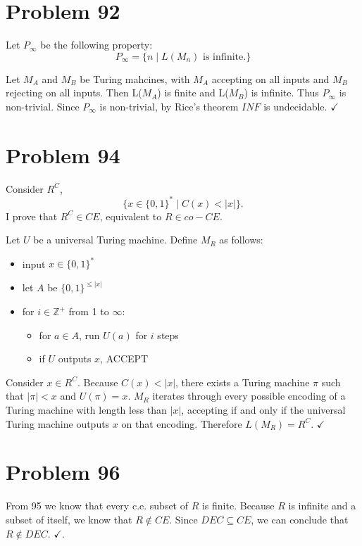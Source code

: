 \documentclass[11pt]{article}
\begin{document}
\section*{Problem 92}

Let $P_\infty$ be the following property:
	\[ P_\infty = \{ n \mid L(M_n) \text{ is infinite}. \}\] 

Let $M_A$ and $M_B$ be Turing mahcines, with $M_A$ accepting on all inputs and $M_B$ rejecting on all inputs.
Then L($M_A$) is finite and L($M_B$) is infinite. 
Thus $P_\infty$ is non-trivial.
Since $P_\infty$ is non-trivial, by Rice's theorem $INF$ is undecidable. $\checkmark$


\section*{Problem 94}

Consider $R^C$,
	\[ \{x \in \{0,1\}^* \mid C(x) < |x| \}. \]
I prove that $R^C \in CE$, equivalent to $R \in co-CE$.

Let $U$ be a universal Turing machine.
Define $M_R$ as follows:
\begin{itemize}
	\item input $x \in \{0,1\}^* $
	\item let $A$ be $\{0,1\}^{\leq |x|}$
	\item for $i \in \mathbb{Z}^+$ from 1 to $\infty$:
	\begin{itemize}
		\item for $a \in A$, run $U(a)$ for $i$ steps
		\item if $U$ outputs $x$, ACCEPT
	\end{itemize}
\end{itemize}

Consider $x \in R^C$.
Because $C(x) < |x|$, there exists a Turing machine $\pi$ such that $|\pi| < x$ and $U(\pi) = x$.
$M_R$ iterates through every possible encoding of a Turing machine with length less than $|x|$, accepting if and only if the universal Turing machine outputs $x$ on that encoding.
Therefore $L(M_R) = R^C$. $\checkmark$



\section*{Problem 96}

From 95 we know that every c.e. subset of $R$ is finite.
Because $R$ is infinite and a subset of itself, we know that $R \notin CE$.
Since $DEC \subseteq CE$, we can conclude that $R \notin DEC$. $\checkmark$.
\end{document}
